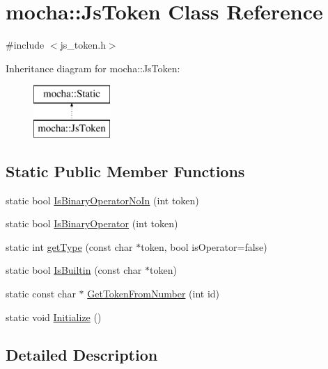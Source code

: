 \hypertarget{classmocha_1_1_js_token}{
\section{mocha::JsToken Class Reference}
\label{classmocha_1_1_js_token}
}


{\ttfamily \#include $<$js\_\-token.h$>$}

Inheritance diagram for mocha::JsToken:\begin{figure}[H]
\begin{center}
\leavevmode
\includegraphics[height=2.000000cm]{classmocha_1_1_js_token}
\end{center}
\end{figure}
\subsection*{Static Public Member Functions}
\begin{DoxyCompactItemize}
\item 
static bool \hyperlink{classmocha_1_1_js_token_aad088ff85a52cf401fd186c65f4edb5b}{IsBinaryOperatorNoIn} (int token)
\item 
static bool \hyperlink{classmocha_1_1_js_token_ae5404136fbe925909f735601a64c1c3c}{IsBinaryOperator} (int token)
\item 
static int \hyperlink{classmocha_1_1_js_token_aa753032591f6a45f50a3541f1d9fd4b2}{getType} (const char $\ast$token, bool isOperator=false)
\item 
static bool \hyperlink{classmocha_1_1_js_token_ae4217ff176dd91f7c1f82769ccebd970}{IsBuiltin} (const char $\ast$token)
\item 
static const char $\ast$ \hyperlink{classmocha_1_1_js_token_adf70e096336b29adb683bab22b46dc4e}{GetTokenFromNumber} (int id)
\item 
static void \hyperlink{classmocha_1_1_js_token_a06d2a7c263b66de3b95f5ad8166cf495}{Initialize} ()
\end{DoxyCompactItemize}


\subsection{Detailed Description}


